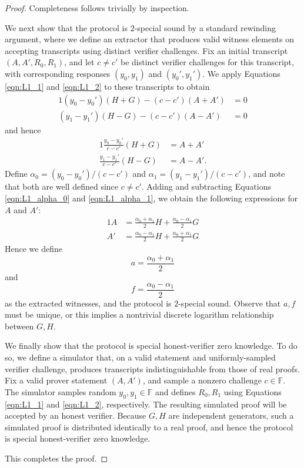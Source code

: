 \documentclass{article}
\newcommand{\F}{\mathbb{F}}
\begin{document}
\begin{proof}
	Completeness follows trivially by inspection.

	We next show that the protocol is $2$-special sound by a standard rewinding argument, where we define an extractor that produces valid witness elements on accepting transcripts using distinct verifier challenges.
	Fix an initial transcript $(A,A',R_0,R_1)$, and let $c \neq c'$ be distinct verifier challenges for this transcript, with corresponding responses $(y_0,y_1)$ and $(y_0',y_1')$.
	We apply Equations \ref{eqn:L1_1} and \ref{eqn:L1_2} to these transcripts to obtain
	\begin{alignat*}{1}
		(y_0 - y_0')(H + G) - (c - c')(A + A') &= 0 \\
		(y_1 - y_1')(H - G) - (c - c')(A - A') &= 0
	\end{alignat*}
	and hence
	\begin{alignat}{1}
		\frac{y_0 - y_0'}{c - c'} (H + G) &= A + A'	\label{eqn:L1_alpha_0} \\	
		\frac{y_1 - y_1'}{c - c'} (H - G) &= A - A'. \label{eqn:L1_alpha_1}
	\end{alignat}
	Define $\alpha_0 = (y_0 - y_0')/(c - c')$ and $\alpha_1 = (y_1 - y_1')/(c - c')$, and note that both are well defined since $c \neq c'$.
	Adding and subtracting Equations \ref{eqn:L1_alpha_0} and \ref{eqn:L1_alpha_1}, we obtain the following expressions for $A$ and $A'$:
	\begin{alignat*}{1}
		A &= \frac{\alpha_0 + \alpha_1}{2} H + \frac{\alpha_0 - \alpha_1}{2} G \\
		A' &= \frac{\alpha_0 - \alpha_1}{2} H + \frac{\alpha_0 + \alpha_1}{2} G
	\end{alignat*}
	Hence we define $$a = \frac{\alpha_0 + \alpha_1}{2}$$ and $$f = \frac{\alpha_0 - \alpha_1}{2}$$ as the extracted witnesses, and the protocol is $2$-special sound.
	Observe that $a,f$ must be unique, or this implies a nontrivial discrete logarithm relationship between $G,H$.

	We finally show that the protocol is special honest-verifier zero knowledge.
	To do so, we define a simulator that, on a valid statement and uniformly-sampled verifier challenge, produces transcripts indistinguishable from those of real proofs.
	Fix a valid prover statement $(A,A')$, and sample a nonzero challenge $c \in \F$.
	The simulator samples random $y_0,y_1 \in \F$ and defines $R_0,R_1$ using Equations \ref{eqn:L1_1} and \ref{eqn:L1_2}, respectively.
	The resulting simulated proof will be accepted by an honest verifier.
	Because $G,H$ are independent generators, such a simulated proof is distributed identically to a real proof, and hence the protocol is special honest-verifier zero knowledge.

	This completes the proof.
\end{proof}
\end{document}

